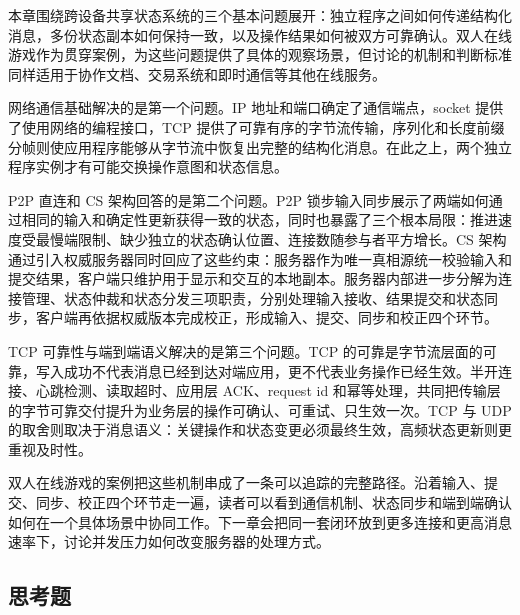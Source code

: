 本章围绕跨设备共享状态系统的三个基本问题展开：独立程序之间如何传递结构化消息，多份状态副本如何保持一致，以及操作结果如何被双方可靠确认。双人在线游戏作为贯穿案例，为这些问题提供了具体的观察场景，但讨论的机制和判断标准同样适用于协作文档、交易系统和即时通信等其他在线服务。

网络通信基础解决的是第一个问题。IP 地址和端口确定了通信端点，socket 提供了使用网络的编程接口，TCP 提供了可靠有序的字节流传输，序列化和长度前缀分帧则使应用程序能够从字节流中恢复出完整的结构化消息。在此之上，两个独立程序实例才有可能交换操作意图和状态信息。

P2P 直连和 CS 架构回答的是第二个问题。P2P 锁步输入同步展示了两端如何通过相同的输入和确定性更新获得一致的状态，同时也暴露了三个根本局限：推进速度受最慢端限制、缺少独立的状态确认位置、连接数随参与者平方增长。CS 架构通过引入权威服务器同时回应了这些约束：服务器作为唯一真相源统一校验输入和提交结果，客户端只维护用于显示和交互的本地副本。服务器内部进一步分解为连接管理、状态仲裁和状态分发三项职责，分别处理输入接收、结果提交和状态同步，客户端再依据权威版本完成校正，形成输入、提交、同步和校正四个环节。

TCP 可靠性与端到端语义解决的是第三个问题。TCP 的可靠是字节流层面的可靠，写入成功不代表消息已经到达对端应用，更不代表业务操作已经生效。半开连接、心跳检测、读取超时、应用层 ACK、request id 和幂等处理，共同把传输层的字节可靠交付提升为业务层的操作可确认、可重试、只生效一次。TCP 与 UDP 的取舍则取决于消息语义：关键操作和状态变更必须最终生效，高频状态更新则更重视及时性。

双人在线游戏的案例把这些机制串成了一条可以追踪的完整路径。沿着输入、提交、同步、校正四个环节走一遍，读者可以看到通信机制、状态同步和端到端确认如何在一个具体场景中协同工作。下一章会把同一套闭环放到更多连接和更高消息速率下，讨论并发压力如何改变服务器的处理方式。

\subsection{思考题}

